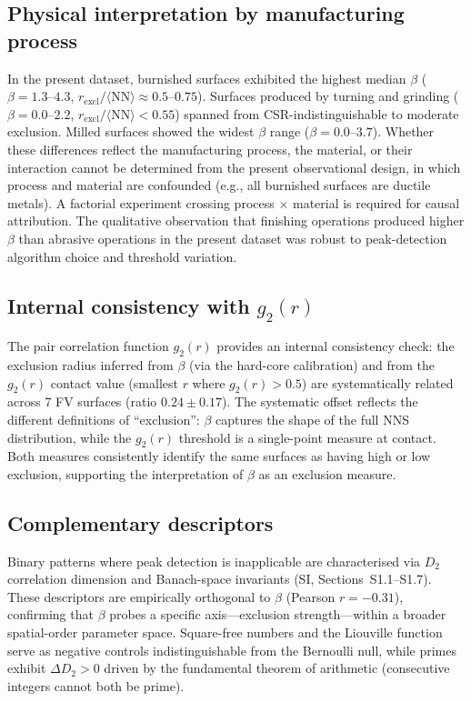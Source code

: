 \documentclass[final,1p,times]{elsarticle}
\theoremstyle{definition}
\begin{document}
\subsection{Physical interpretation by manufacturing process}

In the present dataset, burnished surfaces exhibited the highest
median $\beta$ ($\beta = 1.3$--$4.3$, $r_{\text{excl}}/\langle\text{NN}\rangle
\approx 0.5$--$0.75$). Surfaces produced by turning
and grinding ($\beta = 0.0$--$2.2$, $r_{\text{excl}}/\langle\text{NN}\rangle
< 0.55$) spanned from CSR-indistinguishable to moderate exclusion.
Milled surfaces showed the widest $\beta$ range
($\beta = 0.0$--$3.7$). Whether these differences reflect the
manufacturing process, the material, or their interaction cannot
be determined from the present observational design, in which
process and material are confounded (e.g., all burnished surfaces
are ductile metals). A factorial experiment crossing process
$\times$ material is required for causal attribution. The
qualitative observation that finishing operations produced higher
$\beta$ than abrasive operations in the present dataset was robust
to peak-detection algorithm choice and threshold variation.

\subsection{Internal consistency with $g_2(r)$}

The pair correlation function $g_2(r)$ provides an internal consistency
check: the exclusion radius inferred from $\beta$ (via the hard-core
calibration) and from the $g_2(r)$ contact value (smallest $r$ where
$g_2(r) > 0.5$) are systematically related across 7 FV surfaces (ratio
$0.24 \pm 0.17$). The systematic offset reflects the different
definitions of ``exclusion'': $\beta$ captures the shape of the full
NNS distribution, while the $g_2(r)$ threshold is a single-point
measure at contact. Both measures consistently identify the same
surfaces as having high or low exclusion, supporting the interpretation
of $\beta$ as an exclusion measure.

\subsection{Complementary descriptors}

Binary patterns where peak detection is inapplicable are characterised
via $D_2$ correlation dimension and Banach-space invariants
(SI, Sections~S1.1--S1.7). These descriptors are empirically
orthogonal to $\beta$ (Pearson $r=-0.31$), confirming that $\beta$
probes a specific axis---exclusion strength---within a broader
spatial-order parameter space. Square-free numbers and the Liouville
function serve as negative controls indistinguishable from the
Bernoulli null, while primes exhibit $\Delta D_2>0$ driven by the
fundamental theorem of arithmetic (consecutive integers cannot both
be prime).
\end{document}
